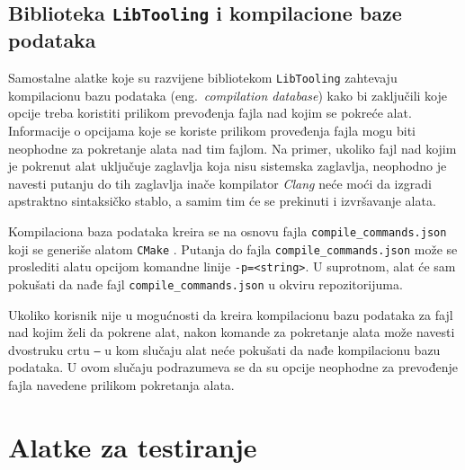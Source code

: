\documentclass[12pt,oneside]{memoir}
\begin{document}
\subsection{Biblioteka \texttt{LibTooling} i kompilacione baze podataka}
Samostalne alatke koje su razvijene bibliotekom \texttt{Lib\-Tooling} zahtevaju kompilacionu bazu podataka (eng.~\textit{compilation database}) kako bi zaklju\v{c}ili koje opcije treba koristiti prilikom prevođenja fajla nad kojim se pokre\'{c}e alat. Informacije o opcijama koje se koriste prilikom proveđenja fajla mogu biti neophodne za pokretanje alata nad tim fajlom. Na primer, ukoliko fajl nad kojim je pokrenut alat uklju\v{c}uje zaglavlja koja nisu sistemska zaglavlja, neophodno je navesti putanju do tih zaglavlja ina\v{c}e kompilator \textit{Clang} ne\'{c}e mo\'{c}i da izgradi apstraktno sintaksi\v{c}ko stablo, a samim tim \'{c}e se prekinuti i izvr\v{s}avanje alata.
\par
Kompilaciona baza podataka kreira se na osnovu fajla \texttt{compile\_commands.json} koji se generi\v{s}e alatom \texttt{CMake} \cite{compilationDatabase}.
Putanja do fajla \texttt{compile\_commands.json}  mo\v{z}e se proslediti alatu opcijom komandne linije \texttt{-p=<string>}. U suprotnom, alat \'{c}e sam poku\v{s}ati da nađe fajl \texttt{compile\_commands.json} u okviru repozitorijuma.
\par
Ukoliko korisnik nije u mogu\'{c}nosti da kreira kompilacionu bazu podataka za fajl nad kojim \v{z}eli da pokrene alat, nakon komande za pokretanje alata mo\v{z}e navesti dvostruku crtu \texttt{--} u kom slu\v{c}aju alat ne\'{c}e poku\v{s}ati da nađe kompilacionu bazu podataka. U ovom slu\v{c}aju
podrazumeva se da su opcije neophodne za prevođenje fajla navedene prilikom pokretanja alata. 

\section{Alatke za testiranje}
\end{document}
